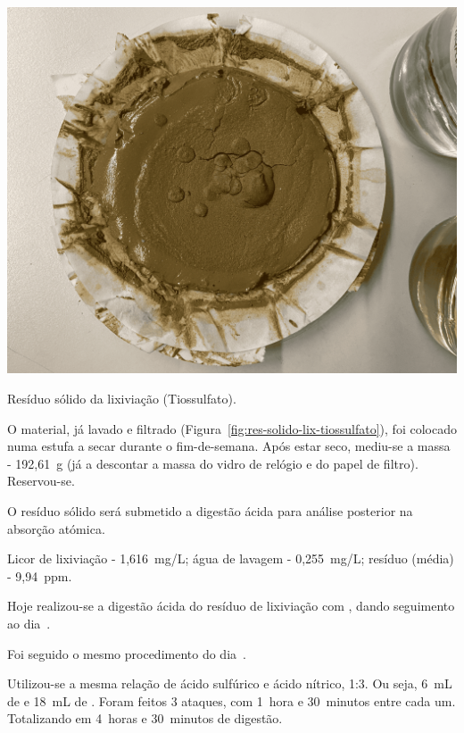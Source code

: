 \begin{marginfigure}
    \centering
    \includegraphics[width=0.9\linewidth]{figures/residuo_sol_lix_tiossulfato}
    \caption{Resíduo sólido da lixiviação (Tiossulfato).}
    \label{fig:res-solido-lix-tiossulfato}
\end{marginfigure}

O material, já lavado e filtrado (Figura~\ref{fig:res-solido-lix-tiossulfato}), foi colocado numa estufa a secar durante o fim-de-semana.
Após estar seco, mediu-se a massa - 192,61~g (já a descontar a massa do vidro de relógio e do papel de filtro).
Reservou-se.

O resíduo sólido será submetido a digestão ácida para análise posterior na absorção atómica.

 Licor de lixiviação - 1,616~mg/L; água de lavagem - 0,255~mg/L; resíduo (média) - 9,94~ppm.

\hrulefill



Hoje realizou-se a digestão ácida do resíduo de lixiviação com \TSP{}, dando seguimento ao dia~.

Foi seguido o mesmo procedimento do dia~.

Utilizou-se a mesma relação de ácido sulfúrico e ácido nítrico, 1:3.
Ou seja, 6~mL de  e 18~mL de .
Foram feitos 3 ataques, com 1~hora e 30~minutos entre cada um.
Totalizando em 4~horas e 30~minutos de digestão.


